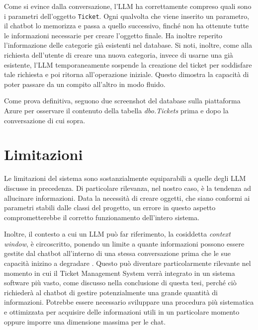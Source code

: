 Come si evince dalla conversazione, l'LLM ha correttamente compreso quali sono i parametri dell'oggetto \texttt{Ticket}. Ogni qualvolta che viene
inserito un parametro, il chatbot lo memorizza e passa a quello successivo, finché non ha ottenute tutte le informazioni necessarie per creare l'oggetto finale.
Ha inoltre reperito l'informazione delle categorie già esistenti nel database. Si noti, inoltre, come alla richiesta dell'utente di creare una nuova categoria, invece di usarne una
già esistente, l'LLM temporaneamente sospende la creazione del ticket per soddisfare tale richiesta e poi ritorna all'operazione iniziale. 
Questo dimostra la capacità di poter passare da un compito all'altro in modo fluido.

\newpage
Come prova definitiva, seguono due screenshot del database sulla piattaforma Azure per osservare il contenuto della tabella \textit{dbo.Tickets} 
prima e dopo la conversazione di cui sopra.



\newpage
\section{Limitazioni}
Le limitazioni del sistema sono sostanzialmente equiparabili a quelle degli LLM discusse in precedenza. Di particolare rilevanza, nel nostro caso, 
è la tendenza ad allucinare informazioni. Data la necessità di creare oggetti, che siano conformi ai parametri stabili dalle classi del progetto, 
un errore in questo aspetto comprometterebbe il corretto funzionamento dell'intero sistema.

Inoltre, il contesto a cui un LLM può far riferimento, la cosiddetta \textit{context window}, è circoscritto, ponendo un limite a quante informazioni 
possono essere gestite dal chatbot all'interno di una stessa conversazione prima che le sue capacità inizino a degradare \cite{ibm_context_window}. 
Questo può diventare particolarmente rilevante nel momento in cui il Ticket Management System verrà integrato in un sistema software più vasto, 
come discusso nella conclusione di questa tesi, perché ciò richiederà al chatbot di gestire potenzialmente una grande quantità di 
informazioni. Potrebbe essere necessario sviluppare una procedura più sistematica e ottimizzata per acquisire delle informazioni utili
in un particolare momento oppure imporre una dimensione massima per le chat.